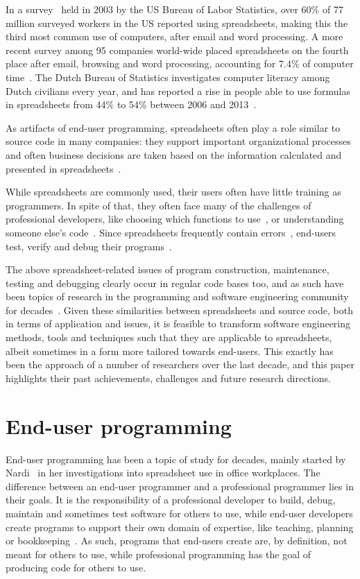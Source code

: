 \documentclass[conference]{IEEEtran}
\begin{document}
In a survey~\cite{BLS2003} held in 2003 by the US Bureau of Labor Statistics, over 60\% of 77 million surveyed workers in the US reported using spreadsheets, making this the third most common use of computers, after email and word processing. A more recent survey among 95 companies world-wide placed spreadsheets on the fourth place after email, browsing and word processing, accounting for 7.4\% of computer time~\cite{Wellnomics2007}. The Dutch Bureau of Statistics investigates computer literacy among Dutch civilians every year, and has reported a rise in people able to use formulas in spreadsheets from 44\% to 54\% between 2006 and 2013~\cite{CBS2013}.

As artifacts of end-user programming, spreadsheets often play a role similar to source code in many companies: they support important organizational processes and often business decisions are taken based on the information calculated and presented in spreadsheets~\cite{hermans_supporting_2011}.

While spreadsheets are commonly used, their users often have little training as programmers. In spite of that, they often face many of the challenges of professional developers, like choosing which functions to use~\cite{Ko2004}, or understanding someone else's code~\cite{Ko2011}. Since spreadsheets frequently contain errors~\cite{Panko1998}, end-users test, verify and debug their programs~\cite{Hermans2013-Cascon,Ko2004-Why}.

The above spreadsheet-related issues of program construction, maintenance, testing and debugging clearly occur in regular code bases too, and as such have been topics of research in the programming and software engineering community for decades~\cite{Ko2011}. Given these similarities between spreadsheets and source code, both in terms of application and issues, it is feasible to transform software engineering methods, tools and techniques such that they are applicable to spreadsheets, albeit sometimes in a form more tailored towards end-users. This exactly has been the approach of a number of researchers over the last decade, and this paper highlights their past achievements, challenges and future research directions. 


\section{End-user programming}
End-user programming has been a topic of study for decades, mainly started by Nardi~\cite{Nardi1993} in her investigations into spreadsheet use in office workplaces. The difference between an end-user programmer and a professional programmer lies in their goals. It is the responsibility of a professional developer to build, debug, maintain and sometimes test software for others to use, while end-user developers create programs to support their own domain of expertise, like teaching, planning or bookkeeping~\cite{Ko2011}. As such, programs that end-users create are, by definition, not meant for others to use, while professional programming has the goal of producing code for others to use. 
\end{document}
